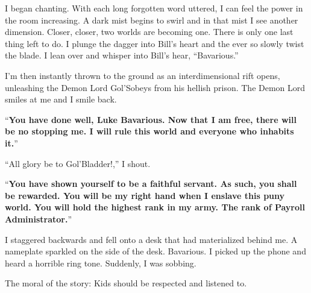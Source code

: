 I began chanting. With each long forgotten word uttered, I can feel
the power in the room increasing. A dark mist begins to swirl and
in that mist I see another dimension. Closer, closer, two worlds
are becoming one. There is only one last thing left to do. I plunge
the dagger into Bill's heart and the ever so slowly twist the
blade. I lean over and whisper into Bill's hear, ``Bavarious.''



I'm then instantly thrown to the ground as an interdimensional rift
opens, unleashing the Demon Lord Gol'Sobeys from his hellish
prison. The Demon Lord smiles at me and I smile back.



``{\bf You have done well, Luke Bavarious. Now that I am free, there
  will be no stopping me. I will rule this world and everyone who
  inhabits it.}''



``All glory be to Gol'Bladder!,'' I shout.



``{\bf You have shown yourself to be a faithful servant. As such, you
  shall be rewarded. You will be my right hand when I enslave this puny
  world. You will hold the highest rank in my army. The rank of Payroll
  Administrator.}''



I staggered backwards and fell onto a desk that had materialized
behind me. A nameplate sparkled on the side of the desk. Bavarious.
I picked up the phone and heard a horrible ring tone. Suddenly, I
was sobbing.



The moral of the story: Kids should be respected and listened
to.



